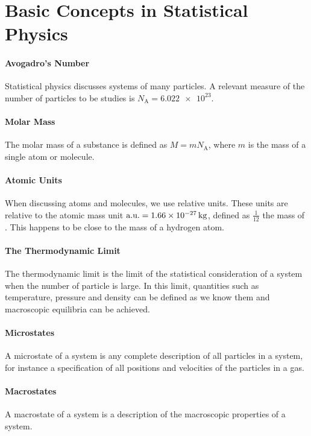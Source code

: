 \section{Basic Concepts in Statistical Physics}

\paragraph{Avogadro's Number}
Statistical physics discusses systems of many particles. A relevant measure of the number of particles to be studies is $N_{\text{A}} = \num{6.022e23}$.

\paragraph{Molar Mass}
The molar mass of a substance is defined as $M = mN_{\text{A}}$, where $m$ is the mass of a single atom or molecule.

\paragraph{Atomic Units}
When discussing atoms and molecules, we use relative units. These units are relative to the atomic mass unit $\text{a.u.} = \SI{1.66e-27}{\kilo\gram}$, defined as $\frac{1}{12}$ the mass of . This happens to be close to the mass of a hydrogen atom.

\paragraph{The Thermodynamic Limit}
The thermodynamic limit is the limit of the statistical consideration of a system when the number of particle is large. In this limit, quantities such as temperature, pressure and density can be defined as we know them and macroscopic equilibria can be achieved.

\paragraph{Microstates}
A microstate of a system is any complete description of all particles in a system, for instance a specification of all positions and velocities of the particles in a gas.

\paragraph{Macrostates}
A macrostate of a system is a description of the macroscopic properties of a system.

